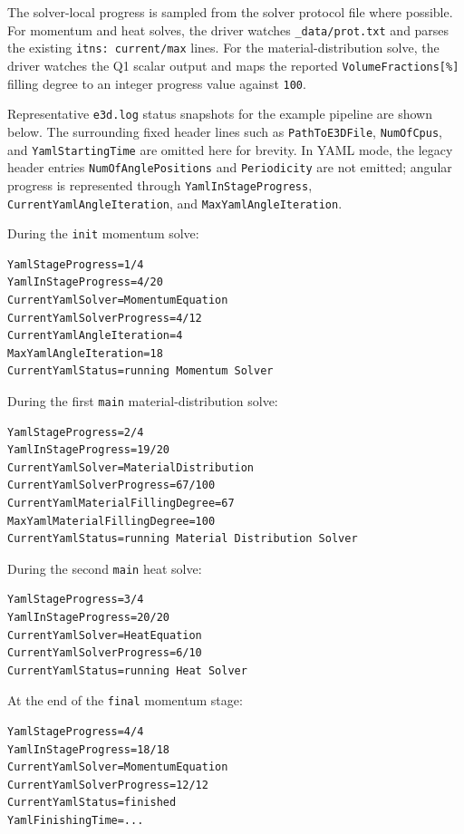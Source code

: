 \documentclass[11pt,a4paper]{article}
\begin{document}
The solver-local progress is sampled from the solver protocol file where possible. For momentum and heat solves,
the driver watches \texttt{\_data/prot.txt} and parses the existing \texttt{itns: current/max} lines. For the
material-distribution solve, the driver watches the Q1 scalar output and maps the reported
\texttt{VolumeFractions[\%]} filling degree to an integer progress value against \texttt{100}.

Representative \texttt{e3d.log} status snapshots for the example pipeline are shown below. The surrounding fixed
header lines such as \texttt{PathToE3DFile}, \texttt{NumOfCpus}, and \texttt{YamlStartingTime} are omitted here for
brevity. In YAML mode, the legacy header entries \texttt{NumOfAnglePositions} and \texttt{Periodicity} are not
emitted; angular progress is represented through \texttt{YamlInStageProgress},
\texttt{CurrentYamlAngleIteration}, and \texttt{MaxYamlAngleIteration}.

During the \texttt{init} momentum solve:

\begin{verbatim}
YamlStageProgress=1/4
YamlInStageProgress=4/20
CurrentYamlSolver=MomentumEquation
CurrentYamlSolverProgress=4/12
CurrentYamlAngleIteration=4
MaxYamlAngleIteration=18
CurrentYamlStatus=running Momentum Solver
\end{verbatim}

During the first \texttt{main} material-distribution solve:

\begin{verbatim}
YamlStageProgress=2/4
YamlInStageProgress=19/20
CurrentYamlSolver=MaterialDistribution
CurrentYamlSolverProgress=67/100
CurrentYamlMaterialFillingDegree=67
MaxYamlMaterialFillingDegree=100
CurrentYamlStatus=running Material Distribution Solver
\end{verbatim}

During the second \texttt{main} heat solve:

\begin{verbatim}
YamlStageProgress=3/4
YamlInStageProgress=20/20
CurrentYamlSolver=HeatEquation
CurrentYamlSolverProgress=6/10
CurrentYamlStatus=running Heat Solver
\end{verbatim}

At the end of the \texttt{final} momentum stage:

\begin{verbatim}
YamlStageProgress=4/4
YamlInStageProgress=18/18
CurrentYamlSolver=MomentumEquation
CurrentYamlSolverProgress=12/12
CurrentYamlStatus=finished
YamlFinishingTime=...
\end{verbatim}
\end{document}

